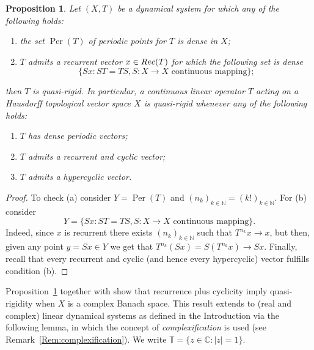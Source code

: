 \documentclass[openright,11pt]{article}
\theoremstyle{plain}
\newtheorem{proposition}[theorem]{Proposition}
\theoremstyle{definition}
\newcommand{\NN}{\mathbb{N}}
\newcommand{\CC}{\mathbb{C}}
\newcommand{\TT}{\mathbb{T}}
\newcommand{\Per}{\operatorname{Per}}
\newcommand{\Rec}{\textup{Rec}}
\begin{document}
\begin{proposition}\label{Pro:sufficient-quasi-rigid}
	Let $(X,T)$ be a dynamical system for which any of the following holds:
	\begin{enumerate}[{\em(a)}]
		\item the set $\Per(T)$ of periodic points for $T$ is dense in $X$;
		
		\item $T$ admits a recurrent vector $x \in \Rec(T)$ for which the following set is dense
		\[
		\{Sx : ST = TS, S:X\longrightarrow X \text{ continuous mapping}\};
		\]
	\end{enumerate}
	then $T$ is quasi-rigid. In particular, a continuous linear operator $T$ acting on a Hausdorff topological vector space $X$ is quasi-rigid whenever any of the following holds:
	\begin{enumerate}[--]
		\item $T$ has dense periodic vectors;
		
		\item $T$ admits a recurrent and cyclic vector;
		
		\item $T$ admits a hypercyclic vector.
	\end{enumerate}
\end{proposition}
\begin{proof}
	To check (a) consider $Y=\Per(T)$ and $(n_k)_{k\in\NN}=(k!)_{k\in\NN}$. For (b) consider
	\[
	Y=\{Sx : ST = TS, S:X\longrightarrow X \text{ continuous mapping}\}.
	\]
	Indeed, since $x$ is recurrent there exists $(n_k)_{k\in\NN}$ such that $T^{n_k}x\to x$, but then, given any point $y=Sx \in Y$ we get that $T^{n_k}(Sx) = S(T^{n_k}x) \to Sx$. Finally, recall that every recurrent and cyclic (and hence every hypercyclic) vector fulfills condition (b).
\end{proof}

Proposition~\ref{Pro:sufficient-quasi-rigid} together with \cite[Corollary~9.2]{CoMaPa2014} show that recurrence plus cyclicity imply quasi-rigidity when $X$ is a complex Banach space. This result extends to (real and complex) linear dynamical systems as defined in the Introduction via the following lemma, in which the concept of {\em complexification} is used (see Remark~\ref{Rem:complexification}). We write $\TT = \{ z \in \CC : |z|=1 \}$.
\end{document}
